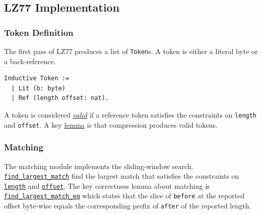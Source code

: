\documentclass[
  a4paper, twocolumn, DIV=calc]{scrartcl}
\begin{document}
\subsection{LZ77 Implementation}
\subsubsection{Token Definition}
The first pass of LZ77 produces a list of \texttt{Token}s. A token is either a
literal byte or a back-reference.
\begin{verbatim}
Inductive Token :=
  | Lit (b: byte)
  | Ref (length offset: nat).
\end{verbatim}
A token is considered
\href{https://github.com/Jatana/LZ78FormalVerification/blob/2819b54b6eb88639461c4fd3504fbc2a87e8cbc0/lz77/LZ_Tokens.v#L11}{\emph{valid}}
if a reference token satisfies the constraints on \texttt{length} and
\texttt{offset}. A key
\href{https://github.com/Jatana/LZ78FormalVerification/blob/2819b54b6eb88639461c4fd3504fbc2a87e8cbc0/lz77/LZ.v#L39}{lemma}
is that compression produces valid tokens.

\subsubsection{Matching}
The matching module implements the sliding-window search.
\href{https://github.com/Jatana/LZ78FormalVerification/blob/2819b54b6eb88639461c4fd3504fbc2a87e8cbc0/lz77/LZ_Matching.v#L33}{\texttt{find\_largest\_match}}
find the largest match that satisfies the constraints on
\href{https://github.com/Jatana/LZ78FormalVerification/blob/2819b54b6eb88639461c4fd3504fbc2a87e8cbc0/lz77/LZ_Matching.v#L99}{\texttt{length}}
and \href{https://github.com/Jatana/LZ78FormalVerification/blob/2819b54b6eb88639461c4fd3504fbc2a87e8cbc0/lz77/LZ_Matching.v#L153}{\texttt{offset}}.
The key correctness lemma about matching is
\href{https://github.com/Jatana/LZ78FormalVerification/blob/2819b54b6eb88639461c4fd3504fbc2a87e8cbc0/lz77/LZ_Matching.v#L214}{\texttt{find\_largest\_match\_eq}}
which states that the slice of \texttt{before} at the reported offset byte-wise
equals the corresponding prefix of \texttt{after} of the reported length.
\end{document}
